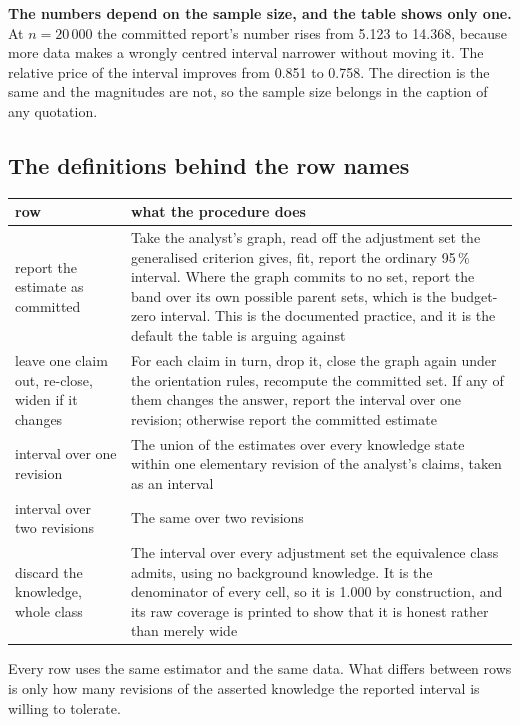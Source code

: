 \textbf{The numbers depend on the sample size, and the table shows only one.} At $n = 20\,000$ the
committed report's number rises from 5.123 to 14.368, because more data makes a wrongly centred
interval narrower without moving it. The relative price of the interval improves from 0.851 to
0.758. The direction is the same and the magnitudes are not, so the sample size belongs in the
caption of any quotation.

\subsection{The definitions behind the row names}

\begin{center}\small
\begin{tabular}{@{}p{4.3cm}p{11.7cm}@{}}
\toprule
row & what the procedure does \\
\midrule
report the estimate as committed & Take the analyst's graph, read off the adjustment set the
generalised criterion gives, fit, report the ordinary 95\,\% interval. Where the graph commits to no
set, report the band over its own possible parent sets, which is the budget-zero interval. This is
the documented practice, and it is the default the table is arguing against \\
\addlinespace
leave one claim out, re-close, widen if it changes & For each claim in turn, drop it, close the graph
again under the orientation rules, recompute the committed set. If any of them changes the answer,
report the interval over one revision; otherwise report the committed estimate \\
\addlinespace
interval over one revision & The union of the estimates over every knowledge state within one
elementary revision of the analyst's claims, taken as an interval \\
\addlinespace
interval over two revisions & The same over two revisions \\
\addlinespace
discard the knowledge, whole class & The interval over every adjustment set the equivalence class
admits, using no background knowledge. It is the denominator of every cell, so it is 1.000 by
construction, and its raw coverage is printed to show that it is honest rather than merely wide \\
\bottomrule
\end{tabular}
\end{center}

Every row uses the same estimator and the same data. What differs between rows is only how many
revisions of the asserted knowledge the reported interval is willing to tolerate.

